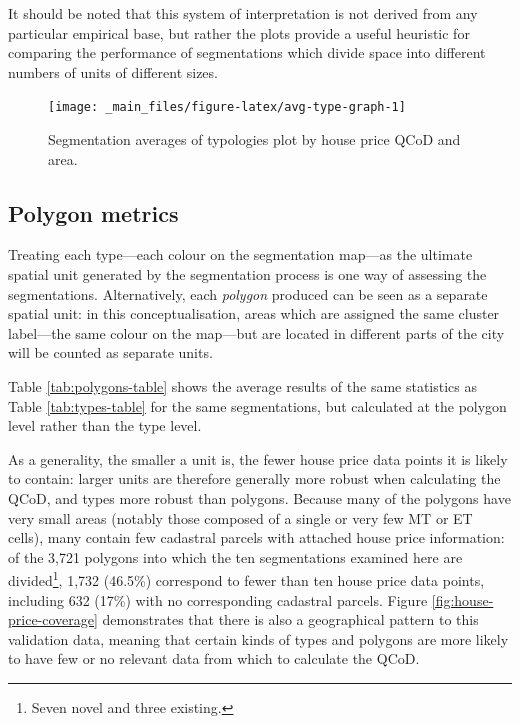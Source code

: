 \documentclass[a4paper, nobind]{templates/ociamthesis}
\begin{document}
It should be noted that this system of interpretation is not derived from any particular empirical base, but rather the plots provide a useful heuristic for comparing the performance of segmentations which divide space into different numbers of units of different sizes.

\begin{figure}
\texttt{[image: \_main\_files/figure-latex/avg-type-graph-1]} \caption{Segmentation averages of typologies plot by house price QCoD and area.}\label{fig:avg-type-graph}
\end{figure}

\hypertarget{polygon-metrics}{%
\subsection{Polygon metrics}\label{polygon-metrics}}

Treating each type---each colour on the segmentation map---as the ultimate spatial unit generated by the segmentation process is one way of assessing the segmentations. Alternatively, each \emph{polygon} produced can be seen as a separate spatial unit: in this conceptualisation, areas which are assigned the same cluster label---the same colour on the map---but are located in different parts of the city will be counted as separate units.

Table \ref{tab:polygons-table} shows the average results of the same statistics as Table \ref{tab:types-table} for the same segmentations, but calculated at the polygon level rather than the type level.

As a generality, the smaller a unit is, the fewer house price data points it is likely to contain: larger units are therefore generally more robust when calculating the QCoD, and types more robust than polygons. Because many of the polygons have very small areas (notably those composed of a single or very few MT or ET cells), many contain few cadastral parcels with attached house price information: of the 3,721 polygons into which the ten segmentations examined here are divided\footnote{Seven novel and three existing.}, 1,732 (46.5\%) correspond to fewer than ten house price data points, including 632 (17\%) with no corresponding cadastral parcels. Figure \ref{fig:house-price-coverage} demonstrates that there is also a geographical pattern to this validation data, meaning that certain kinds of types and polygons are more likely to have few or no relevant data from which to calculate the QCoD.
\end{document}
